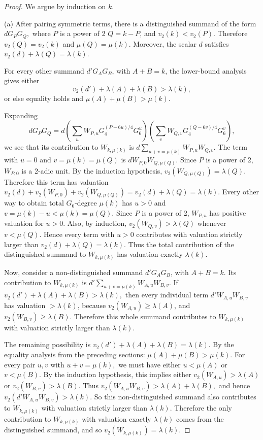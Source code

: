 \documentclass[12pt]{amsart}
\begin{document}
\begin{proof}

We argue by induction on $k$.

(a)  After pairing symmetric terms, there is a distinguished
summand of the form $ dG_PG_Q,$ where $P$ is a power of 2 $Q=k-P$, and $ v_2(k)<v_2(P).$ Therefore $v_2(Q)=v_2(k)$ and $\mu(Q)=\mu(k)$. Moreover, the scalar $d$ satisfies $ v_2(d)+\lambda(Q)=\lambda(k). $

For every other summand  $d'G_AG_B$, with $A+B=k$, the lower-bound analysis gives either
\[
v_2(d')+\lambda(A)+\lambda(B)>\lambda(k),
\]
or else equality holds and $\mu(A)+\mu(B)>\mu(k).$

Expanding
\[ dG_PG_Q=d \left( \sum_u W_{P,u} G_4^{(P-6u)/4} G_6^u \right) \left( \sum_v W_{Q,v} G_4^{(Q-6v)/4} G_6^v \right),\] 
we see that its contribution to \(W_{k,\mu(k)}\) is $d\sum_{u+v=\mu(k)}W_{P,u}W_{Q,v}. $ The term with $u=0$ and $v=\mu(k)=\mu(Q)$ is $dW_{P,0}W_{Q,\mu(Q)}$. Since $P$ is a power of 2, $W_{P,0}$ is a 2-adic unit. By the induction hypothesis, $v_2(W_{Q,\mu(Q)})=\lambda(Q).$ Therefore this term has valuation $v_2(d)+v_2(W_{P,0})+v_2(W_{Q,\mu(Q)}) = v_2(d)+\lambda(Q) = \lambda(k). $ Every other way to obtain total $G_6$-degree $\mu(k)$ has $u>0$ and $v=\mu(k)-u<\mu(k)=\mu(Q).$ Since $P$ is a power of 2, $W_{P,u}$ has positive valuation for $u>0$.  Also, by induction, $v_2(W_{Q,v})>\lambda(Q)$ whenever $v<\mu(Q)$.  Hence every term with  $u>0$ contributes with valuation strictly larger than $v_2(d)+ \lambda(Q)=\lambda(k).$ Thus the total contribution of the distinguished summand to $W_{k,\mu(k)}$ has valuation exactly $\lambda(k)$.

Now, consider a non-distinguished summand $d'G_AG_B$, with $A+B=k$. Its contribution to $W_{k,\mu(k)}$ is $d'\sum_{u+v=\mu(k)}W_{A,u}W_{B,v}$. If
$ v_2(d')+\lambda(A)+\lambda(B)>\lambda(k),$ then every individual term $d'W_{A,u}W_{B,v}$ has valuation \(>\lambda(k)\), because $v_2(W_{A,u})\ge \lambda(A)$, and $v_2(W_{B,v})\ge \lambda(B).$ Therefore this whole summand contributes to \(W_{k,\mu(k)}\) with valuation strictly larger than  $\lambda(k)$.

The remaining possibility is $v_2(d')+\lambda(A)+\lambda(B)=\lambda(k).$
By the equality analysis from the preceding sections: $\mu(A)+\mu(B)>\mu(k).$ For every pair $u,v$ with $u+v=\mu(k),$ we must have either
$ u<\mu(A)$  or $v<\mu(B).$ By the induction hypothesis, this implies either
$v_2(W_{A,u})>\lambda(A)$ or $v_2(W_{B,v})>\lambda(B).$ Thus
$ v_2(W_{A,u}W_{B,v})>\lambda(A)+\lambda(B),$
and hence $v_2(d'W_{A,u}W_{B,v})>\lambda(k).$ So this non-distinguished summand also contributes to $W_{k,\mu(k)}$ with valuation strictly larger than $\lambda(k)$. Therefore the only contribution to $W_{k,\mu(k)}$ with valuation exactly $\lambda(k)$ comes from the distinguished summand, and so $v_2(W_{k,\mu(k)})=\lambda(k).$


\end{proof}
\end{document}
